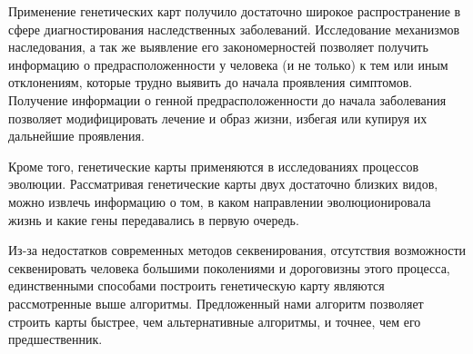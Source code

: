 \documentclass{matmex-diploma-custom}
\begin{document}
Применение генетических карт получило достаточно широкое
распространение в сфере диагностирования наследственных
заболеваний. Исследование механизмов наследования, а так же выявление
его закономерностей позволяет получить информацию о
предрасположенности у человека (и не только) к тем или иным
отклонениям, которые трудно выявить до начала проявления
симптомов. Получение информации о генной предрасположенности до начала
заболевания позволяет модифицировать лечение и образ жизни, избегая
или купируя их дальнейшие проявления.

Кроме того, генетические карты применяются в исследованиях процессов
эволюции. Рассматривая генетические карты двух достаточно близких
видов, можно извлечь информацию о том, в каком направлении
эволюционировала жизнь и какие гены передавались в первую очередь.

Из-за недостатков современных методов секвенирования, отсутствия
возможности секвенировать человека большими поколениями и дороговизны
этого процесса, единственными способами построить генетическую карту
являются рассмотренные выше алгоритмы. Предложенный нами алгоритм
позволяет строить карты быстрее, чем альтернативные алгоритмы, и
точнее, чем его предшественник.

\clearpage
{}


\end{document}
